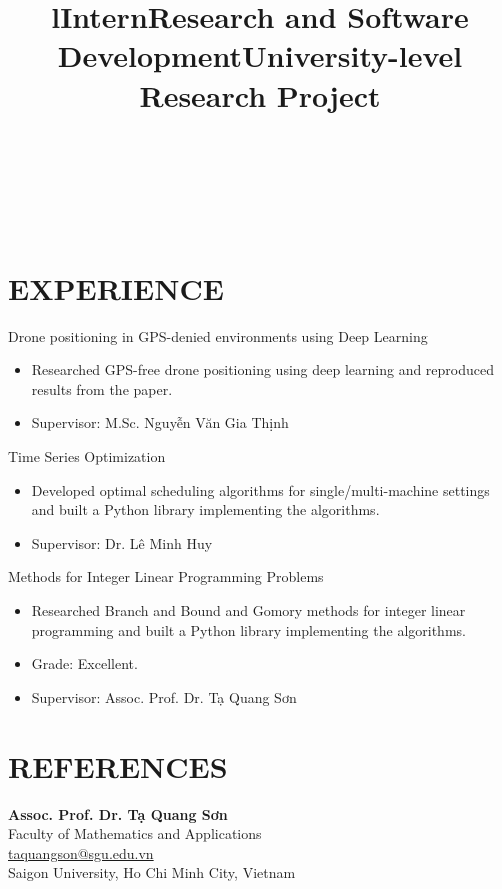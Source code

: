 \documentclass[margin]{res}
\begin{document}
\begin{resume}
\begin{format}
\title{l}\\
\\
\body\\
\end{format}

\section{EXPERIENCE}
\location{}
\title{\textbf{Intern}}
\begin{position}
Drone positioning in GPS-denied environments using Deep Learning
\begin{itemize}
\item Researched GPS-free drone positioning using deep learning and reproduced results from the paper.
\item Supervisor: M.Sc. Nguyễn Văn Gia Thịnh
\end{itemize}
\end{position}

\location{}
\title{\textbf{Research and Software Development}}
\begin{position}
Time Series Optimization
\begin{itemize}
\item Developed optimal scheduling algorithms for single/multi-machine settings and built a Python library implementing the algorithms.
\item Supervisor: Dr. Lê Minh Huy
\end{itemize}
\end{position}

\location{}
\title{\textbf{University-level Research Project}}
\begin{position}
Methods for Integer Linear Programming Problems
\begin{itemize}
\item Researched Branch and Bound and Gomory methods for integer linear programming and built a Python library implementing the algorithms.
\item Grade: Excellent.
\item Supervisor: Assoc. Prof. Dr. Tạ Quang Sơn
\end{itemize}
\end{position}

\section{REFERENCES}
\textbf{Assoc. Prof. Dr. Tạ Quang Sơn}\\
Faculty of Mathematics and Applications\\
\href{mailto:taquangson@sgu.edu.vn}{taquangson@sgu.edu.vn}\\
Saigon University, Ho Chi Minh City, Vietnam


\end{resume}
\end{document}
